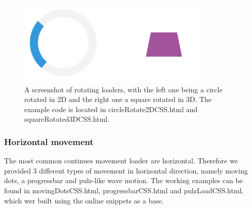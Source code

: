 \begin{figure}[h]
\centering
\includegraphics[keepaspectratio,width=\hsize,height=\halfh]
{images/rotatingLoad.png}

\caption[Rotational Loading Animation Examples]{
A screenshot of rotating loaders, with the left one being a circle rotated in 2D and the right one a square rotated in 3D. The example code is located in circleRotate2DCSS.html and squareRotated3DCSS.html.
}
\label{fig:rotationLoad}
\end{figure}

\subsubsection{Horizontal movement} %
\label{subsub:menu}
The most common continues movement loader are horizontal. Therefore we provided 3 different types of movement in horizontal direction, namely moving dots, a progressbar and pulz-like wave motion. The working examples can be found in  
movingDotsCSS.html, progressbarCSS.html and pulzLoadCSS.html, which wer built using the \citet{otherLoaders} online snippets as a base.

